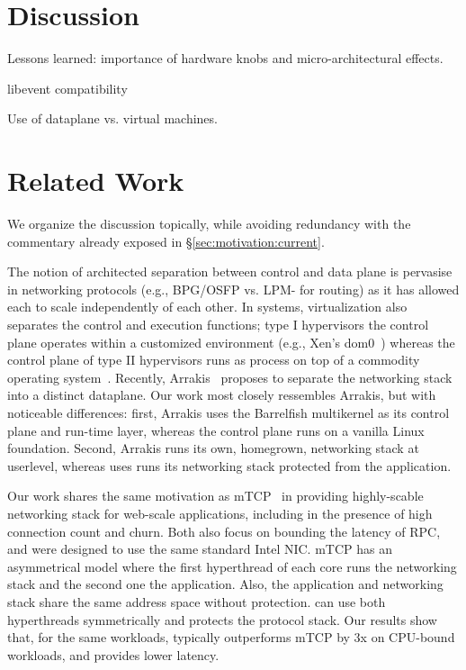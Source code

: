 

\section{Discussion}

\todo Lessons learned: importance of hardware knobs and micro-architectural effects.

\todo libevent compatibility

\todo Use of dataplane vs. virtual machines. 

\section{Related Work}

We organize the discussion topically, while avoiding redundancy with
the commentary already exposed in \S\ref{sec:motivation:current}.


 The notion of
architected separation between control and data plane is pervasise in
networking protocols (e.g., BPG/OSFP vs. LPM- for routing) as it has
allowed each to scale independently of each other.  In systems,
virtualization also separates the control and execution functions;
type I hypervisors the control plane operates within a customized
environment (e.g., Xen's dom0~\cite{DBLP:conf/sosp/BarhamDFHHHN03})
whereas the control plane of type II hypervisors runs as process on
top of a commodity operating
system~\cite{DBLP:journals/tocs/BugnionDRSW12}.  Recently,
Arrakis~\cite{peter2013arrakis,arrakisTR13} proposes to separate the
networking stack into a distinct dataplane.  Our work most closely
ressembles Arrakis, but with noticeable differences: first, Arrakis
uses the Barrelfish multikernel as its control plane and run-time
layer, whereas the \ix control plane runs on a vanilla Linux
foundation.  Second, Arrakis runs its own, homegrown, networking stack
at userlevel, whereas \ix uses runs its networking stack protected
from the application.

 Our work shares the same
motivation as mTCP~\cite{jeong2014mtcp} in providing highly-scable
networking stack for web-scale applications, including in the presence
of high connection count and churn.  Both also focus on bounding the
latency of RPC, and were designed to use the same standard Intel NIC.
mTCP has an asymmetrical model where the first hyperthread of each
core runs the networking stack and the second one the application.
Also, the application and networking stack share the same address
space without protection.  \ix can use both hyperthreads symmetrically
and protects the protocol stack.   Our results show
that, for the same workloads, \ix typically outperforms mTCP by 3x on
CPU-bound workloads, and provides lower latency.
 
